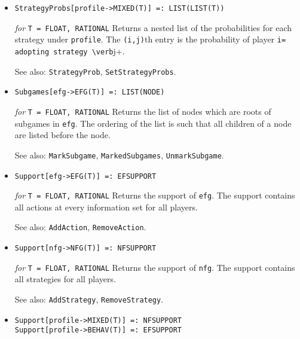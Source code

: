 \begin{itemize}
\item{}
\protect \large \begin{verbatim}
StrategyProbs[profile->MIXED(T)] =: LIST(LIST(T))
\end{verbatim} \normalsize

{\it for} {\tt T = FLOAT, RATIONAL}
\bd
Returns a nested list of the probabilities for each strategy under
\verb+profile+.  The \verb+(i,j)+th entry is the probability of player
\verb+i= adopting strategy \verb+j+.
\item [See also:] \verb+StrategyProb+, \verb+SetStrategyProbs+.
\ed

\item{}
\protect \large \begin{verbatim}
Subgames[efg->EFG(T)] =: LIST(NODE)
\end{verbatim}\normalsize

{\it for} {\tt T = FLOAT, RATIONAL}
\bd
Returns the list of nodes which are roots of subgames in \verb+efg+.
The ordering of the list is such that
all children of a node are listed before the node.
\item [See also:] \verb+MarkSubgame+, \verb+MarkedSubgames+, 
\verb+UnmarkSubgame+.
\ed

\item{}
\protect \large \begin{verbatim}
Support[efg->EFG(T)] =: EFSUPPORT
\end{verbatim}\normalsize

{\it for} {\tt T = FLOAT, RATIONAL}
\bd
Returns the support of \verb+efg+.  The support contains all actions at every
information set for all players.
\item [See also:] \verb+AddAction+, \verb+RemoveAction+.
\ed

\item{}
\protect \large \begin{verbatim}
Support[nfg->NFG(T)] =: NFSUPPORT
\end{verbatim}\normalsize

{\it for} {\tt T = FLOAT, RATIONAL}
\bd
Returns the support of \verb+nfg+.  The support contains all strategies
for all players.
\item [See also:] \verb+AddStrategy+, \verb+RemoveStrategy+.
\ed

\item{}
\protect \large \begin{verbatim}
Support[profile->MIXED(T)] =: NFSUPPORT
Support[profile->BEHAV(T)] =: EFSUPPORT
\end{verbatim}\normalsize


\end{itemize}
